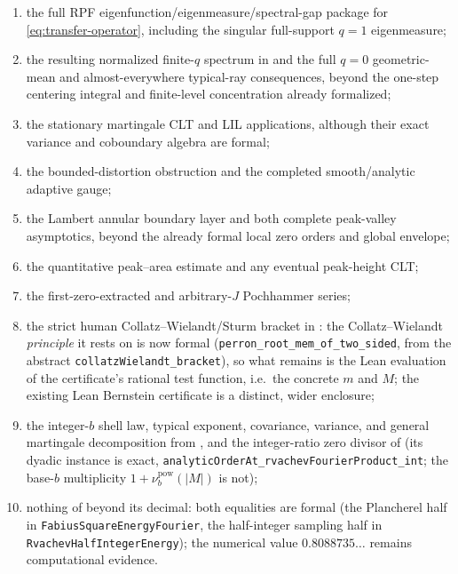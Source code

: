 \documentclass[11pt,oneside]{article}
\numberwithin{equation}{section}
\theoremstyle{definition}
\theoremstyle{remark}
\newcommand{\lean}[1]{\texttt{#1}}
\newcommand{\decl}[1]{\nolinkurl{#1}}
\newcommand{\BasePowerValuation}[1]{\nu^{\mathrm{pow}}_{#1}}
\begin{document}
\begin{enumerate}
\item the full RPF eigenfunction/eigenmeasure/spectral-gap package for
      \eqref{eq:transfer-operator}, including the singular full-support $q=1$ eigenmeasure;
\item the resulting normalized finite-$q$ spectrum in  and the full
      $q=0$ geometric-mean and almost-everywhere typical-ray consequences, beyond the
      one-step centering integral and finite-level concentration already formalized;
\item the stationary martingale CLT and LIL applications, although their exact variance and
      coboundary algebra are formal;
\item the bounded-distortion obstruction and the completed smooth/analytic adaptive gauge;
\item the Lambert annular boundary layer and both complete peak-valley asymptotics, beyond
      the already formal local zero orders and global envelope;
\item the quantitative peak--area estimate and any eventual peak-height CLT;
\item the first-zero-extracted and arbitrary-$J$ Pochhammer series;
\item the strict human Collatz--Wielandt/Sturm bracket in
      : the Collatz--Wielandt \emph{principle} it rests on
      is now formal (\decl{perron_root_mem_of_two_sided}, from the abstract
      \decl{collatzWielandt_bracket}), so what remains is the Lean evaluation of the
      certificate's rational test function, i.e.\ the concrete $m$ and $M$; the existing
      Lean Bernstein certificate is a distinct, wider enclosure;
\item the integer-$b$ shell law, typical exponent, covariance, variance, and general
      martingale decomposition from , and the integer-ratio zero
      divisor of  (its dyadic instance is exact,
      \decl{analyticOrderAt_rvachevFourierProduct_int}; the base-\(b\) multiplicity
      \(1+\BasePowerValuation{b}(|M|)\) is not);
\item nothing of  beyond its decimal: both equalities are
      formal (the Plancherel half in \lean{FabiusSquareEnergyFourier}, the half-integer
      sampling half in \lean{RvachevHalfIntegerEnergy}); the numerical value
      \(0.8088735\ldots\) remains computational evidence.
\end{enumerate}
\end{document}

